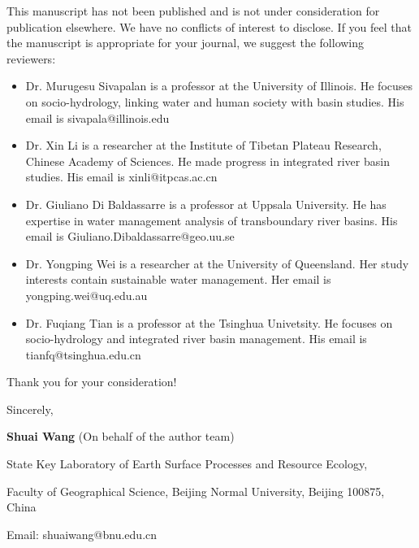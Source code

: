 \documentclass[11pt,a4paper,roman]{moderncv}
\begin{document}
This manuscript has not been published and is not under consideration for publication elsewhere.  We have no conflicts of interest to disclose. If you feel that the manuscript is appropriate for your journal, we suggest the following reviewers:

\begin{itemize}
    \item Dr. Murugesu Sivapalan is a professor at the University of Illinois. He focuses on socio-hydrology, linking water and human society with basin studies. His email is sivapala@illinois.edu
    \item Dr. Xin Li is a researcher at the Institute of Tibetan Plateau Research, Chinese Academy of Sciences. He made progress in integrated river basin studies. His email is xinli@itpcas.ac.cn
    \item Dr. Giuliano Di Baldassarre is a professor at Uppsala University. He has expertise in water management analysis of transboundary river basins. His email is Giuliano.Dibaldassarre@geo.uu.se
    \item Dr. Yongping Wei is a researcher at the University of Queensland. Her study interests contain sustainable water management. Her email is yongping.wei@uq.edu.au
    \item Dr. Fuqiang Tian is a professor at the Tsinghua Univetsity. He focuses on socio-hydrology and integrated river basin management. His email is tianfq@tsinghua.edu.cn
\end{itemize}

\vspace{0.5cm}

Thank you for your consideration!

\vspace{0.5cm}

Sincerely,

\textbf{Shuai Wang} (On behalf of the author team)


State Key Laboratory of Earth Surface Processes and Resource Ecology,

Faculty of Geographical Science, Beijing Normal University, Beijing 100875, China

Email: shuaiwang@bnu.edu.cn
\end{document}
